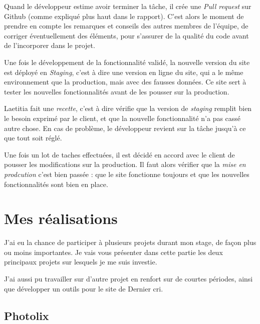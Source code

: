 \documentclass[12pt,a4paper]{article}
\begin{document}
  \bigskip

  Quand le développeur estime avoir terminer la tâche, il crée une
  \emph{Pull request} sur Github (comme expliqué plus haut dans le
  rapport). C'est alors le moment de prendre en compte les remarques et
  conseils des autres membres de l'équipe, de corriger éventuellement des
  éléments, pour s'assurer de la qualité du code avant de l'incorporer
  dans le projet.

  \bigskip

  Une fois le développement de la fonctionnalité validé, la nouvelle
  version du site est déployé en \emph{Staging}, c'est à dire une version
  en ligne du site, qui a le même environnement que la production, mais
  avec des fausses données. Ce site sert à tester les nouvelles
  fonctionnalités avant de les pousser sur la production.

  \bigskip

  Laetitia fait une \emph{recette}, c'est à dire vérifie que la version de
  \emph{staging} remplit bien le besoin exprimé par le client, et que la
  nouvelle fonctionnalité n'a pas cassé autre chose. En cas de problème,
  le développeur revient sur la tâche jusqu'à ce que tout soit réglé.

  \bigskip

  Une fois un lot de taches effectuées, il est décidé en accord avec le
  client de pousser les modifications sur la production. Il faut alors
  vérifier que la \emph{mise en prodcution} c'est bien passée : que le
  site fonctionne toujours et que les nouvelles fonctionnalités sont bien
  en place.

  \newpage

  \section{Mes réalisations}\label{mes-ruxe9alisations}

  \bigskip

  J'ai eu la chance de participer à plusieurs projets durant mon stage, de
  façon plus ou moins importantes. Je vais vous présenter dans cette
  partie les deux principaux projets sur lesquels je me suis investie.

  \bigskip

  J'ai aussi pu travailler sur d'autre projet en renfort sur de courtes
  périodes, ainsi que développer un outils pour le site de Dernier cri.

  \bigskip

  \subsection{Photolix}\label{photolix}
\end{document}
